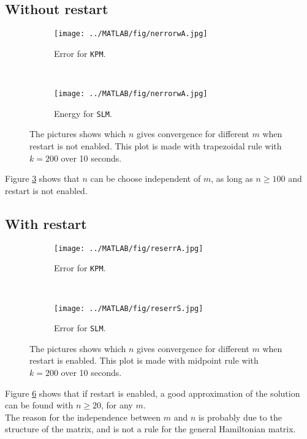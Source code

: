 \subsection{Without restart} %
\begin{figure}[H]
        \centering
        \begin{subfigure}[b]{0.45\textwidth}
                \texttt{[image: ../MATLAB/fig/nerrorwA.jpg]}
                \caption{ Error for \texttt{KPM}. }
                \label{fig:nerrorw}
        \end{subfigure}
        ~
        \begin{subfigure}[b]{0.45\textwidth}
                \texttt{[image: ../MATLAB/fig/nerrorwA.jpg]}
                \caption{ Energy for \texttt{SLM}. \\ }
                \label{fig:nenergyw}
        \end{subfigure}
        \caption{ The pictures shows which $n$ gives convergence for different $m$ when restart is not enabled. This plot is made with trapezoidal rule with $k = 200$ over 10 seconds. }
        \label{fig:n}
\end{figure}
Figure \ref{fig:n} shows that $n$ can be choose independent of $m$, as long as $n \geq 100$ and restart is not enabled.

\subsection{With restart} %

\begin{figure}[H]
        \centering
        \begin{subfigure}[b]{0.45\textwidth}
                \texttt{[image: ../MATLAB/fig/reserrA.jpg]}
                \caption{ Error for \texttt{KPM}. }
                \label{fig:reserrS}
        \end{subfigure}
		~
		\begin{subfigure}[b]{0.45\textwidth}
                \texttt{[image: ../MATLAB/fig/reserrS.jpg]}
                \caption{ Error for \texttt{SLM}. }
                \label{fig:reseneA}
        \end{subfigure}
        \caption{ The pictures shows which $n$ gives convergence for different $m$ when restart is enabled. This plot is made with midpoint rule with $k = 200$ over 10 seconds. }
        \label{fig:res}

\end{figure}
Figure \ref{fig:res} shows that if restart is enabled, a good approximation of the solution can be found with $n \geq 20$, for any $m$.\\
The reason for the independence between $m$ and $n$ is probably due to the structure of the matrix, and is not a rule for the general Hamiltonian matrix.

